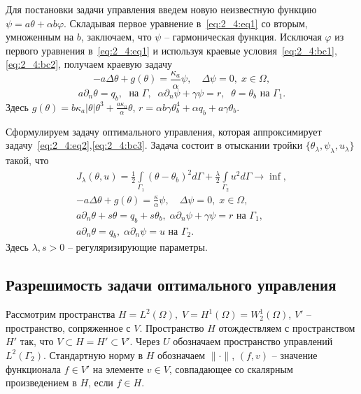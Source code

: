 Для постановки задачи управления введем новую неизвестную функцию
$\psi= a\theta + \alpha b \varphi$.
Складывая первое уравнение в~\eqref{eq:2_4:eq1} со вторым, умноженным на $b$,
заключаем, что $\psi$ -- гармоническая функция.
Исключая $\varphi$ из первого уравнения в~\eqref{eq:2_4:eq1} и используя краевые
условия~\eqref{eq:2_4:bc1},\eqref{eq:2_4:bc2},
получаем краевую задачу
\begin{equation}
    \label{eq:2_4:eq2}
    - a \Delta \theta + g (\theta) = \frac{\kappa_a}{\alpha}\psi, \quad
    \Delta \psi = 0, \; x \in \Omega,
\end{equation}
\begin{equation}
    \label{eq:2_4:bc3}
    a \partial_n \theta = q_b, \; \text{ на }\Gamma, \;\;
    \alpha \partial_n \psi + \gamma \psi  =  r,\;\;
    \theta = \theta_b  \text{ на }\Gamma_1.
\end{equation}
Здесь $g(\theta) = b \kappa_a|\theta|\theta^3 + \frac{a\kappa_a}{\alpha}\theta$, $r=\alpha b \gamma \theta_b^4+ \alpha q_b + a \gamma \theta_b$.

Сформулируем задачу оптимального управления, которая аппроксимирует
задачу~\eqref{eq:2_4:eq2},\eqref{eq:2_4:bc3}.
Задача состоит в отыскании тройки $\{\theta_\lambda,\psi_\lambda,u_\lambda\}$ такой, что
\begin{gather}
    \label{eq:2_4:cost}
    J_\lambda(\theta, u) =
    \frac{1}{2} \int \limits_{\Gamma_1} (\theta - \theta_b)^2 d \Gamma
    + \frac{\lambda}{2}\int\limits_{\Gamma_2} u^2 d\Gamma \rightarrow \inf, \\
    - a \Delta \theta + g (\theta) = \frac{\kappa}{\alpha}\psi, \quad
    \Delta \psi = 0, \; x \in \Omega, \\
    a \partial_n \theta + s \theta = q_b + s \theta_b,
    \; \alpha \partial_n \psi + \gamma \psi = r
    \text{ на } \Gamma_1,\\
    a \partial_n \theta = q_b, \;
    \alpha \partial_n \psi = u \text{ на } \Gamma_2.
\end{gather}
Здесь $\lambda, s > 0$ -- регуляризирующие параметры.

\subsection{Разрешимость задачи оптимального управления}
\label{subsec:ch2/sec4/solvability}
Рассмотрим пространства $H = L^2(\Omega), \; V = H^1(\Omega)=W^1_2(\Omega)$, $V'$
-- пространство, сопряженное с $V$.
Пространство $H$ отождествляем с пространством $H'$ так, что $V \subset H = H' \subset V'$.
Через $U$ обозначаем пространство управлений $L^2(\Gamma_2)$.
Стандартную норму в $H$ обозначаем $\|\cdot\|$,
$(f,v)$ -- значение функционала $f\in V'$ на элементе $v\in V$,
совпадающее со скалярным произведением в $H$, если $f\in H$.


